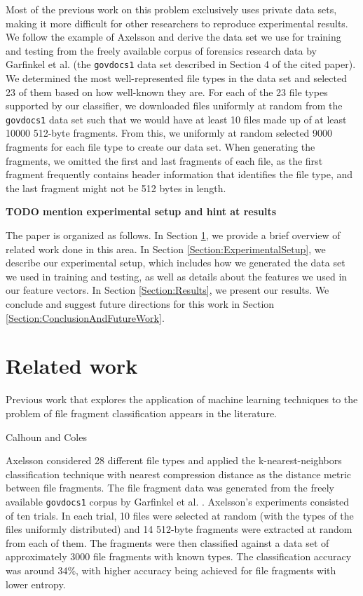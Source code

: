\documentclass[letter,11pt]{article}
\begin{document}
Most of the previous work on this problem exclusively uses private data sets, making it more difficult for other researchers to reproduce experimental results. We follow the example of Axelsson \cite{Axelsson10} and derive the data set we use for training and testing from the freely available corpus of forensics research data by Garfinkel et al. \cite{Garfinkel09} (the \texttt{govdocs1} data set described in Section 4 of the cited paper). We determined the most well-represented file types in the data set and selected 23 of them based on how well-known they are. For each of the 23 file types supported by our classifier, we downloaded files uniformly at random from the \texttt{govdocs1} data set such that we would have at least 10 files made up of at least 10000 512-byte fragments. From this, we uniformly at random selected 9000 fragments for each file type to create our data set. When generating the fragments, we omitted the first and last fragments of each file, as the first fragment frequently contains header information that identifies the file type, and the last fragment might not be 512 bytes in length.

\textbf{TODO mention experimental setup and hint at results}

The paper is organized as follows. In Section \ref{Section:RelatedWork}, we provide a brief overview of related work done in this area. In Section \ref{Section:ExperimentalSetup}, we describe our experimental setup, which includes how we generated the data set we used in training and testing, as well as details about the features we used in our feature vectors. In Section \ref{Section:Results}, we present our results. We conclude and suggest future directions for this work in Section \ref{Section:ConclusionAndFutureWork}.

\section{Related work}
\label{Section:RelatedWork}
Previous work that explores the application of machine learning techniques to the problem of file fragment classification appears in the literature. \cite{Li10, Veenman07}

Calhoun and Coles \cite{Calhoun08}

Axelsson \cite{Axelsson10} considered 28 different file types and applied the k-nearest-neighbors classification technique with nearest compression distance as the distance metric between file fragments. The file fragment data was generated from the freely available \texttt{govdocs1} corpus by Garfinkel et al. \cite{Garfinkel09}. Axelsson's experiments consisted of ten trials. In each trial, 10 files were selected at random (with the types of the files uniformly distributed) and 14 512-byte fragments were extracted at random from each of them. The fragments were then classified against a data set of approximately 3000 file fragments with known types. The classification accuracy was around 34\%, with higher accuracy being achieved for file fragments with lower entropy.
\end{document}
